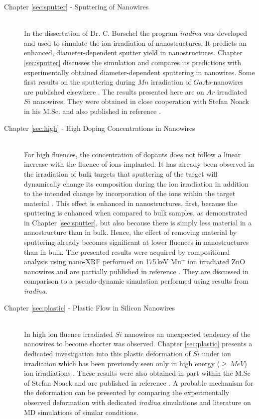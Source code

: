 \begin{description}
  \item[\normalfont Chapter \ref{sec:sputter} - Sputtering of Nanowires] \hfill \\
  In the dissertation of Dr. C. Borschel \cite{borschel_ion-solid_2012} the program \emph{iradina} \cite{borschel_ion_2011} was developed and used to simulate the ion irradiation of nanostructures. It predicts an enhanced, diameter-dependent sputter yield in nanostructures. Chapter \ref{sec:sputter} discusses the simulation and compares its predictions with experimentally obtained diameter-dependent sputtering in nanowires. Some first results on the sputtering during $Mn$ irradiation of $GaAs$-nanowires are published elsewhere \cite{johannes_enhanced_2014}. The results presented here are on $Ar$ irradiated $Si$ nanowires. They were obtained in close cooperation with Stefan Noack \cite{noack_sputter_2014} in his M.Sc. and also published in reference \cite{johannes_anomalous_2015}.
  \item[\normalfont Chapter \ref{sec:high} - High Doping Concentrations in Nanowires] \hfill \\
   For high fluences, the concentration of dopants does not follow a linear increase with the fluence of ions implanted. It has already been observed in the irradiation of bulk targets that sputtering of the target will dynamically change its composition during the ion irradiation in addition to the intended change by incorporation of the ions within the target material \cite{moller_tridyn_1984,moller_tridyn-binary_1988,miyagawa_computer_1991,sigmund_alloy_1993,eckstein_oscillations_2000}. This effect is enhanced in nanostructures, first, because the sputtering is enhanced when compared to bulk samples, as demonstrated in Chapter \ref{sec:sputter}, but also because there is simply less material in a nanostructure than in bulk. Hence, the effect of removing material by sputtering already becomes significant at lower fluences in nanostructures than in bulk. The presented results were acquired by compositional analysis using nano-XRF performed on 175\,keV Mn$^+$ ion irradiated ZnO nanowires and are partially published in reference \cite{johannes_enhanced_2014}. They are discussed in comparison to a pseudo-dynamic simulation performed using results from \emph{iradina}.
  \item[\normalfont Chapter \ref{sec:plastic} - Plastic Flow in Silicon Nanowires] \hfill \\
  In high ion fluence irradiated $Si$ nanowires an unexpected tendency of the nanowires to become shorter was observed. Chapter \ref{sec:plastic} presents a dedicated investigation into this plastic deformation of $Si$ under ion irradiation which has been previously seen only in high energy ($\ge\,MeV$) ion irradiations \cite{volkert_stress_1991,trinkaus_viscoelastic_1995,hedler_amorphous_2004,hedler_boundary_2005}. These results were also obtained in part within the M.Sc of Stefan Noack \cite{noack_sputter_2014} and are published in reference \cite{johannes_anomalous_2015}. A probable mechanism for the deformation can be presented by comparing the experimentally observed deformation with dedicated \emph{iradina} simulations and literature on MD simulations of similar conditions.
\end{description}

\addtolength{\textheight}{-1cm}